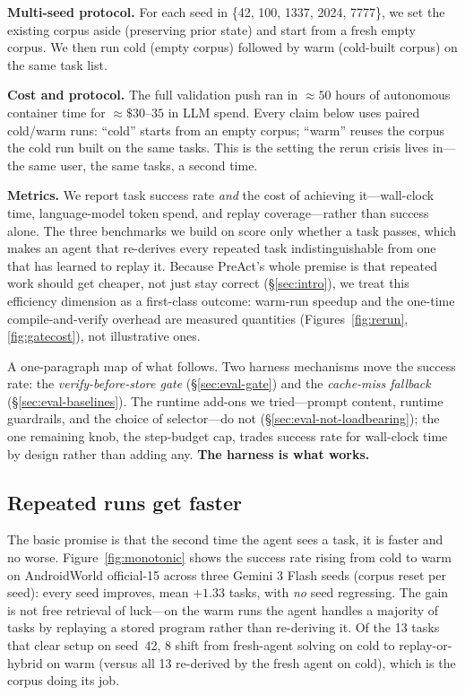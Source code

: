 \documentclass[11pt]{article}
\begin{document}
\textbf{Multi-seed protocol.} For each seed in \{42, 100, 1337, 2024, 7777\}, we set the existing corpus aside (preserving prior state) and start from a fresh empty corpus. We then run cold (empty corpus) followed by warm (cold-built corpus) on the same task list.

\textbf{Cost and protocol.} The full validation push ran in $\approx 50$ hours of autonomous container time for $\approx\$30$--$35$ in LLM spend. Every claim below uses paired cold/warm runs: ``cold'' starts from an empty corpus; ``warm'' reuses the corpus the cold run built on the same tasks. This is the setting the rerun crisis lives in---the same user, the same tasks, a second time.

\textbf{Metrics.} We report task success rate \emph{and} the cost of achieving it---wall-clock time, language-model token spend, and replay coverage---rather than success alone. The three benchmarks we build on score only whether a task passes, which makes an agent that re-derives every repeated task indistinguishable from one that has learned to replay it. Because PreAct's whole premise is that repeated work should get cheaper, not just stay correct (\S\ref{sec:intro}), we treat this efficiency dimension as a first-class outcome: warm-run speedup and the one-time compile-and-verify overhead are measured quantities (Figures~\ref{fig:rerun}, \ref{fig:gatecost}), not illustrative ones.

A one-paragraph map of what follows. Two harness mechanisms move the success rate: the \emph{verify-before-store gate} (\S\ref{sec:eval-gate}) and the \emph{cache-miss fallback} (\S\ref{sec:eval-baselines}). The runtime add-ons we tried---prompt content, runtime guardrails, and the choice of selector---do not (\S\ref{sec:eval-not-loadbearing}); the one remaining knob, the step-budget cap, trades success rate for wall-clock time by design rather than adding any. \textbf{The harness is what works.}

\subsection{Repeated runs get faster}
\label{sec:eval-monotonic}

The basic promise is that the second time the agent sees a task, it is faster and no worse. Figure~\ref{fig:monotonic} shows the success rate rising from cold to warm on AndroidWorld official-15 across three Gemini 3 Flash seeds (corpus reset per seed): every seed improves, mean $+1.33$ tasks, with \emph{no} seed regressing. The gain is not free retrieval of luck---on the warm runs the agent handles a majority of tasks by replaying a stored program rather than re-deriving it. Of the 13 tasks that clear setup on seed~42, 8 shift from fresh-agent solving on cold to replay-or-hybrid on warm (versus all 13 re-derived by the fresh agent on cold), which is the corpus doing its job.
\end{document}
